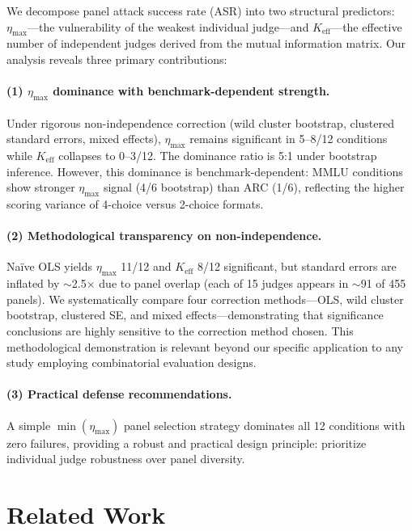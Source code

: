 \documentclass[11pt,a4paper]{article}
\newcommand{\etamax}{\ensuremath{\eta_{\max}}}
\newcommand{\keff}{\ensuremath{K_{\text{eff}}}}
\begin{document}
We decompose panel attack success rate (ASR) into two structural predictors: $\etamax$---the vulnerability of the weakest individual judge---and $\keff$---the effective number of independent judges derived from the mutual information matrix.
Our analysis reveals three primary contributions:

\paragraph{(1) $\etamax$ dominance with benchmark-dependent strength.}
Under rigorous non-independence correction (wild cluster bootstrap, clustered standard errors, mixed effects), $\etamax$ remains significant in 5--8/12 conditions while $\keff$ collapses to 0--3/12.
The dominance ratio is 5:1 under bootstrap inference.
However, this dominance is benchmark-dependent: MMLU conditions show stronger $\etamax$ signal (4/6 bootstrap) than ARC (1/6), reflecting the higher scoring variance of 4-choice versus 2-choice formats.

\paragraph{(2) Methodological transparency on non-independence.}
Na\"ive OLS yields $\etamax$ 11/12 and $\keff$ 8/12 significant, but standard errors are inflated by $\sim$2.5$\times$ due to panel overlap (each of 15 judges appears in $\sim$91 of 455 panels).
We systematically compare four correction methods---OLS, wild cluster bootstrap, clustered SE, and mixed effects---demonstrating that significance conclusions are highly sensitive to the correction method chosen.
This methodological demonstration is relevant beyond our specific application to any study employing combinatorial evaluation designs.

\paragraph{(3) Practical defense recommendations.}
A simple $\min(\etamax)$ panel selection strategy dominates all 12 conditions with zero failures, providing a robust and practical design principle: prioritize individual judge robustness over panel diversity.

\section{Related Work}
\label{sec:related}
\end{document}
